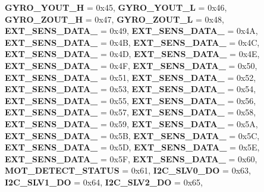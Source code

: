 \begin{DoxyCompactItemize}
\newline
{\bfseries G\+Y\+R\+O\+\_\+\+Y\+O\+U\+T\+\_\+H} = 0x45, 
{\bfseries G\+Y\+R\+O\+\_\+\+Y\+O\+U\+T\+\_\+L} = 0x46, 
{\bfseries G\+Y\+R\+O\+\_\+\+Z\+O\+U\+T\+\_\+H} = 0x47, 
{\bfseries G\+Y\+R\+O\+\_\+\+Z\+O\+U\+T\+\_\+L} = 0x48, 
\newline
{\bfseries E\+X\+T\+\_\+\+S\+E\+N\+S\+\_\+\+D\+A\+T\+A\+\_} = 0x49, 
{\bfseries E\+X\+T\+\_\+\+S\+E\+N\+S\+\_\+\+D\+A\+T\+A\+\_} = 0x4A, 
{\bfseries E\+X\+T\+\_\+\+S\+E\+N\+S\+\_\+\+D\+A\+T\+A\+\_} = 0x4B, 
{\bfseries E\+X\+T\+\_\+\+S\+E\+N\+S\+\_\+\+D\+A\+T\+A\+\_} = 0x4C, 
\newline
{\bfseries E\+X\+T\+\_\+\+S\+E\+N\+S\+\_\+\+D\+A\+T\+A\+\_} = 0x4D, 
{\bfseries E\+X\+T\+\_\+\+S\+E\+N\+S\+\_\+\+D\+A\+T\+A\+\_} = 0x4E, 
{\bfseries E\+X\+T\+\_\+\+S\+E\+N\+S\+\_\+\+D\+A\+T\+A\+\_} = 0x4F, 
{\bfseries E\+X\+T\+\_\+\+S\+E\+N\+S\+\_\+\+D\+A\+T\+A\+\_} = 0x50, 
\newline
{\bfseries E\+X\+T\+\_\+\+S\+E\+N\+S\+\_\+\+D\+A\+T\+A\+\_} = 0x51, 
{\bfseries E\+X\+T\+\_\+\+S\+E\+N\+S\+\_\+\+D\+A\+T\+A\+\_} = 0x52, 
{\bfseries E\+X\+T\+\_\+\+S\+E\+N\+S\+\_\+\+D\+A\+T\+A\+\_} = 0x53, 
{\bfseries E\+X\+T\+\_\+\+S\+E\+N\+S\+\_\+\+D\+A\+T\+A\+\_} = 0x54, 
\newline
{\bfseries E\+X\+T\+\_\+\+S\+E\+N\+S\+\_\+\+D\+A\+T\+A\+\_} = 0x55, 
{\bfseries E\+X\+T\+\_\+\+S\+E\+N\+S\+\_\+\+D\+A\+T\+A\+\_} = 0x56, 
{\bfseries E\+X\+T\+\_\+\+S\+E\+N\+S\+\_\+\+D\+A\+T\+A\+\_} = 0x57, 
{\bfseries E\+X\+T\+\_\+\+S\+E\+N\+S\+\_\+\+D\+A\+T\+A\+\_} = 0x58, 
\newline
{\bfseries E\+X\+T\+\_\+\+S\+E\+N\+S\+\_\+\+D\+A\+T\+A\+\_} = 0x59, 
{\bfseries E\+X\+T\+\_\+\+S\+E\+N\+S\+\_\+\+D\+A\+T\+A\+\_} = 0x5A, 
{\bfseries E\+X\+T\+\_\+\+S\+E\+N\+S\+\_\+\+D\+A\+T\+A\+\_} = 0x5B, 
{\bfseries E\+X\+T\+\_\+\+S\+E\+N\+S\+\_\+\+D\+A\+T\+A\+\_} = 0x5C, 
\newline
{\bfseries E\+X\+T\+\_\+\+S\+E\+N\+S\+\_\+\+D\+A\+T\+A\+\_} = 0x5D, 
{\bfseries E\+X\+T\+\_\+\+S\+E\+N\+S\+\_\+\+D\+A\+T\+A\+\_} = 0x5E, 
{\bfseries E\+X\+T\+\_\+\+S\+E\+N\+S\+\_\+\+D\+A\+T\+A\+\_} = 0x5F, 
{\bfseries E\+X\+T\+\_\+\+S\+E\+N\+S\+\_\+\+D\+A\+T\+A\+\_} = 0x60, 
\newline
{\bfseries M\+O\+T\+\_\+\+D\+E\+T\+E\+C\+T\+\_\+\+S\+T\+A\+T\+US} = 0x61, 
{\bfseries I2\+C\+\_\+\+S\+L\+V0\+\_\+\+DO} = 0x63, 
{\bfseries I2\+C\+\_\+\+S\+L\+V1\+\_\+\+DO} = 0x64, 
{\bfseries I2\+C\+\_\+\+S\+L\+V2\+\_\+\+DO} = 0x65, 

\end{DoxyCompactItemize}
